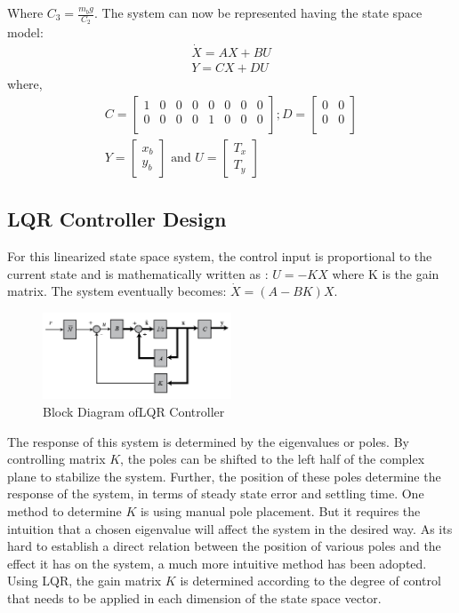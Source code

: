 \documentclass[conference]{IEEEtran}
\begin{document}
Where $C_3 = \frac{m_b g}{C_2}$.
The system can now be represented having the state space model:
\begin{align}
\dot X = A X + B U \label{eq20}\\
Y = C X + D U\label{eq21}
\end{align}
where,
\begin{equation}\begin{split}
C = \begin{bmatrix}
1 & 0 & 0 & 0 & 0 & 0 & 0 & 0 \\
0 & 0 & 0 & 0 & 1 & 0 & 0 & 0 \\
\end{bmatrix} ; 
D = \begin{bmatrix}
0 & 0 \\
0 & 0 \\
\end{bmatrix} \\
Y = \begin{bmatrix}
x_b\\
y_b
\end{bmatrix}
\mbox{ and }
U = \begin{bmatrix}
T_x\\
T_y
\end{bmatrix}
\end{split}
\label{eq22}\end{equation}



\subsection*{LQR Controller Design}
For this linearized state space system, the control input is proportional to the current state and is mathematically written as : $U=-KX$ where K is the gain matrix.
The system eventually becomes: $ \dot X = (A-BK)X$.

\begin{figure}[htbp]
\centerline{\includegraphics[width=0.5\textwidth]{BDLQR.png}}
\caption{Block Diagram ofLQR Controller}
\label{fig3}
\end{figure}

The response of this system is determined by the eigenvalues or poles. By controlling matrix $K$, the poles can be shifted to the left half of the complex plane to stabilize the system. Further, the position of these poles determine the response of the system, in terms of steady state error and settling time.
One method to determine $K$ is using manual pole placement. But it requires the intuition that a chosen eigenvalue will affect the system in the desired way. As its hard to establish a direct relation between the position of various poles and the effect it has on the system, a much more intuitive method has been adopted. Using LQR, the gain matrix $K$ is determined according to the degree of control that needs to be applied in each dimension of the state space vector.
\end{document}
